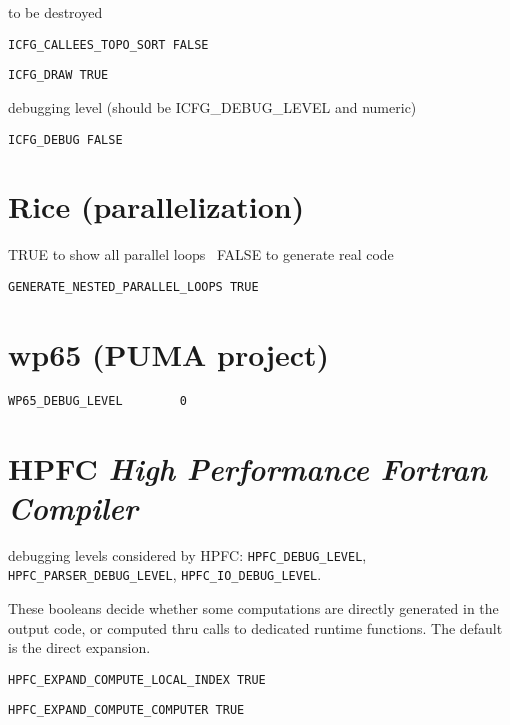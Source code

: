 to be destroyed

\begin{verbatim}
ICFG_CALLEES_TOPO_SORT FALSE
\end{verbatim}

\begin{verbatim}
ICFG_DRAW TRUE
\end{verbatim}

debugging level (should be ICFG_DEBUG_LEVEL and numeric)

\begin{verbatim}
ICFG_DEBUG FALSE
\end{verbatim}

\section{Rice (parallelization)}

TRUE to show all parallel loops  \
FALSE to generate real code

\begin{verbatim}
GENERATE_NESTED_PARALLEL_LOOPS TRUE
\end{verbatim}

\section{wp65 (PUMA project)}

\begin{verbatim}
WP65_DEBUG_LEVEL        0
\end{verbatim}

\section{HPFC {\em High Performance Fortran Compiler}}

debugging levels considered by HPFC: {\tt HPFC\_DEBUG\_LEVEL}, 
{\tt HPFC\_PARSER\_DEBUG\_LEVEL}, {\tt HPFC\_IO\_DEBUG\_LEVEL}.

  These booleans decide whether some computations are directly
generated in the output code, or computed thru calls to dedicated
runtime functions. The default is the direct expansion.

\begin{verbatim}
HPFC_EXPAND_COMPUTE_LOCAL_INDEX TRUE
\end{verbatim}

\begin{verbatim}
HPFC_EXPAND_COMPUTE_COMPUTER TRUE
\end{verbatim}

